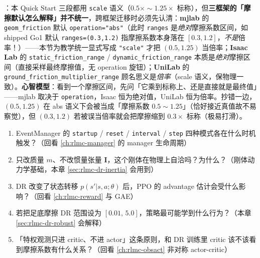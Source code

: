 \begin{finenote}
：本 Quick Start 三段都用 \verb|scale| 语义（$0.5\times\sim1.25\times$ 标称），但\textbf{三框架的「摩擦默认怎么解释」并不统一}，跨框架迁移时必须先认清：\textbf{mjlab} 的 \verb|geom_friction| 默认 \verb|operation="abs"|（此时 \verb|ranges| 是\emph{绝对}摩擦系数区间，如 shipped Go1 默认 \verb|ranges=(0.3,1.2)| 指摩擦系数本身落在 $[0.3,1.2]$，\emph{不是}倍率！）——本节为教学统一显式写成 \verb|"scale"| 才把 $(0.5,1.25)$ 当倍率；\textbf{Isaac Lab} 的 \verb|static_friction_range| / \verb|dynamic_friction_range| 本质是\emph{绝对}摩擦区间（直接采样最终摩擦值，无 operation 旋钮）；\textbf{UniLab} 的 \verb|ground_friction_multiplier_range| 顾名思义是\emph{倍率}（scale 语义，保物理一致）。\textbf{心智模型}：看到一个摩擦区间，先问「它乘到标称上、还是直接就是最终值」——mjlab 取决于 \verb|operation|，Isaac 恒为绝对值，UniLab 恒为倍率。抄错一边，$(0.5,1.25)$ 在 abs 语义下会被当成「摩擦系数 $0.5\sim1.25$」（恰好接近真值故不易察觉），但 $(0.3,1.2)$ 若被误当倍率就会把摩擦缩到 $0.3\times$ 标称（极易打滑）。
\end{finenote}

\begin{practice}
\begin{enumerate}
  \item EventManager 的 \verb|startup| / \verb|reset| / \verb|interval| / \verb|step| 四种模式各在什么时机触发？（回看 \cref{ch:rlmc-manager} 的 manager 生命周期）
  \item 只改质量 $m$、不改惯量张量 $\mathbf I$，这个刚体在物理上自洽吗？为什么？（刚体动力学基础，本章 \cref{sec:rlmc-dr-inertia} 会用到）
  \item DR 改变了状态转移 $p(s'|s,a;\theta)$ 后，PPO 的 advantage 估计会受什么影响？（回看 \cref{ch:rlmc-reward} 与 GAE）
  \item 若把足底摩擦 DR 范围设为 $[0.01,\,5.0]$，策略最可能学到什么行为？（本章 \cref{sec:rlmc-dr-robust} 会解释）
  \item 「特权观测只进 critic、不进 actor」这条原则，和 DR 训练里 critic 该不该看到摩擦系数有什么关系？（回看 \cref{ch:rlmc-obsact} 非对称 actor-critic）
\end{enumerate}
\end{practice}

